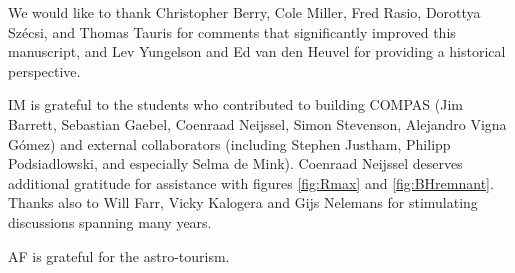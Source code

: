 \documentclass[iop,onecolumn]{revtex4-1}
\begin{document}
\begin{acknowledgements}
We would like to thank Christopher Berry, Cole Miller, Fred Rasio, Dorottya Sz\'{e}csi, and Thomas Tauris for comments that significantly improved this manuscript, and Lev Yungelson and Ed van den Heuvel for providing a historical perspective.

IM is grateful to the students who contributed to building COMPAS (Jim Barrett, Sebastian Gaebel, Coenraad Neijssel, Simon Stevenson, Alejandro Vigna G\'{o}mez) and external collaborators (including Stephen Justham, Philipp Podsiadlowski, and especially Selma de Mink).  Coenraad Neijssel deserves additional gratitude for assistance with figures \ref{fig:Rmax} and \ref{fig:BHremnant}. Thanks also to  Will Farr, Vicky Kalogera and Gijs Nelemans for stimulating discussions spanning many years.

AF is grateful for the astro-tourism.
\end{acknowledgements}



\end{document}

